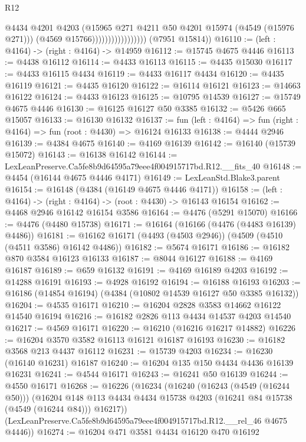 \begin{lexlean}{R12}
\begin{coremodule}
                                      @4434
                                      @4201
                                      @4203
                                      (@15965 @271 @4211 @50 @4201 @15974 (@4549 (@15976 @271)))
                                      (@4569 @15766)))))))))))))))))
      (@7951 @15814))
@16110 := (left : @4164) -> (right : @4164) -> @14959
@16112 := @15745 @4675 @4446
@16113 := @4438 @16112
@16114 := @4433 @16113
@16115 := @4435 @15030
@16117 := @4433 @16115 @4434
@16119 := @4433 @16117 @4434
@16120 := @4435 @16119
@16121 := @4435 @16120
@16122 := @16114 @16121
@16123 := @14663 @16122
@16124 := @4433 @16123
@16125 := @10795 @14539
@16127 := @15749 @4675 @4446
@16130 := @16125 @16127 @50 @3385
@16132 := @5426 @665 @15057
@16133 := @16130 @16132
@16137 := fun (left : @4164) => fun (right : @4164) => fun (root : @4430) => @16124 @16133
@16138 := @4444 @2946
@16139 := @4384 @4675
@16140 := @4169 @16139
@16142 := @16140 (@15739 @15072)
@16143 := @16138 @16142
@16144 := LexLeanPreserve.Ca5fe8b9d64595a79eee4f004915717bd.R12.__fits_40
@16148 := @4454 (@16144 @4675 @4446 @4171)
@16149 := LexLeanStd.Blake3.parent
@16154 := @16148 (@4384 (@16149 @4675 @4446 @4171))
@16158 := (left : @4164) -> (right : @4164) -> (root : @4430) -> @16143 @16154
@16162 := @4468 @2946 @16142 @16154 @3586
@16164 := @4476 (@5291 @15070)
@16166 := @4476 (@4480 @15738)
@16171 := @16164 (@16166 (@4476 (@4483 @16139) @4486))
@16181 := @16162 @16171 (@4493 (@4503 @2946)) (@4509 (@4510 (@4511 @3586) @16142 @4486))
@16182 := @5674 @16171
@16186 := @16182 @870 @3584 @16123 @16133
@16187 := @8044 @16127
@16188 := @4169 @16187
@16189 := @659 @16132
@16191 := @4169 @16189 @4203
@16192 := @14288 @16191
@16193 := @4928 @16192
@16194 := @16188 @16193
@16203 := @16186 (@14854 @16194) (@4384 (@10802 @14539 @16127 @50 @3385 @16132))
@16204 := @4535 @16171
@16210 := @16204 @2828 @3583 @14662 @16122 @14540 @16194
@16216 := @16182 @2826 @113 @4434 @14537 @4203 @14540
@16217 := @4569 @16171
@16220 := @16210 (@16216 @16217 @14882)
@16226 := @16204 @3570 @3582 @16113 @16121 @16187 @16193
@16230 := @16182 @3568 @213 @4437 @16112
@16231 := @15739 @4203
@16234 := @16230 (@16140 @16231) @16187
@16240 := @16204 @135 @150 @4434 @4436 @16139 @16231
@16241 := @4544 @16171
@16243 := @16241 @50 @16139
@16244 := @4550 @16171
@16268 := @16226
    (@16234
      (@16240
        (@16243 (@4549 (@16244 @50)))
        (@16204 @148 @113 @4434 @4434 @15738 @4203 (@16241 @84 @15738 (@4549 (@16244 @84))) @16217))
      (LexLeanPreserve.Ca5fe8b9d64595a79eee4f004915717bd.R12.__rel_46 @4675 @4446))
@16274 := @16204 @471 @3581 @4434 @16120 @470 @16192

\end{coremodule}
\end{lexlean}
